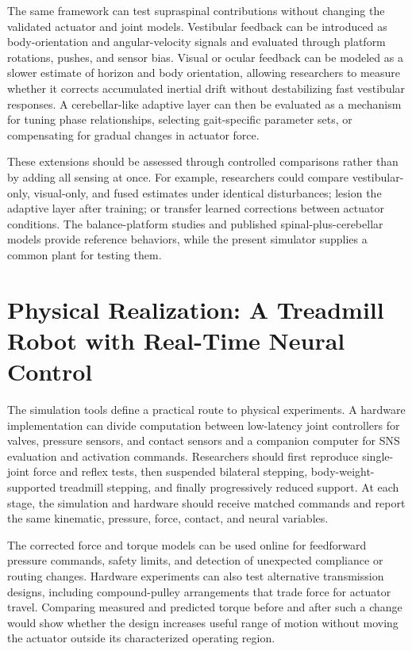 \begin{reviewchange}
The same framework can test supraspinal contributions without changing the validated actuator and joint models. Vestibular feedback can be introduced as body-orientation and angular-velocity signals and evaluated through platform rotations, pushes, and sensor bias. Visual or ocular feedback can be modeled as a slower estimate of horizon and body orientation, allowing researchers to measure whether it corrects accumulated inertial drift without destabilizing fast vestibular responses. A cerebellar-like adaptive layer can then be evaluated as a mechanism for tuning phase relationships, selecting gait-specific parameter sets, or compensating for gradual changes in actuator force.

These extensions should be assessed through controlled comparisons rather than by adding all sensing at once. For example, researchers could compare vestibular-only, visual-only, and fused estimates under identical disturbances; lesion the adaptive layer after training; or transfer learned corrections between actuator conditions. The balance-platform studies and published spinal-plus-cerebellar models provide reference behaviors, while the present simulator supplies a common plant for testing them.
\end{reviewchange}

\section{Physical Realization: A Treadmill Robot with Real-Time Neural Control}\label{sec:fw_hardware}

\begin{reviewchange}
The simulation tools define a practical route to physical experiments. A hardware implementation can divide computation between low-latency joint controllers for valves, pressure sensors, and contact sensors and a companion computer for SNS evaluation and activation commands. Researchers should first reproduce single-joint force and reflex tests, then suspended bilateral stepping, body-weight-supported treadmill stepping, and finally progressively reduced support. At each stage, the simulation and hardware should receive matched commands and report the same kinematic, pressure, force, contact, and neural variables.

The corrected force and torque models can be used online for feedforward pressure commands, safety limits, and detection of unexpected compliance or routing changes. Hardware experiments can also test alternative transmission designs, including compound-pulley arrangements that trade force for actuator travel. Comparing measured and predicted torque before and after such a change would show whether the design increases useful range of motion without moving the actuator outside its characterized operating region.
\end{reviewchange}

